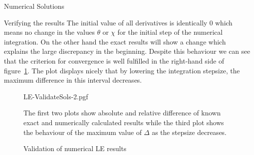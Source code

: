 \begin{section}{Numerical Solutions}
\begin{subsection}{Verifying the results}
The initial value of all derivatives is identically $0$ which means no change in the values $\theta$ or $\chi$ for the initial step of the numerical integration.
On the other hand the exact results will show a change which explains the large discrepancy in the beginning.
Despite this behaviour we can see that the criterion for convergence is well fulfilled in the right-hand side of figure~\ref{fig:4-NumSol-Plt-ValidateLEResults}.
The plot displays nicely that by lowering the integration stepsize, the maximum difference in this interval decreases.
\begin{figure}[H]
	\centering
	{LE-ValidateSols-2.pgf}
	\caption{Validation of numerical LE results}
	The first two plots show absolute and relative difference of known exact and numerically calculated results while the third plot shows the behaviour of the maximum value of $\Delta$ as the stepsize decreases.
	\label{fig:4-NumSol-Plt-ValidateLEResults}
\end{figure}\noindent

\end{subsection}
\end{section}
